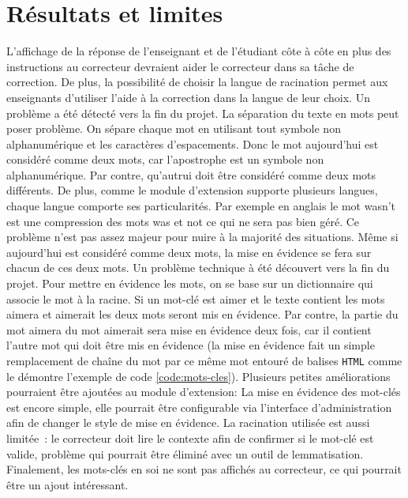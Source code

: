 ﻿\chapter{R\'esultats et limites}
L'affichage de la r\'eponse de l'enseignant et de l'\'etudiant c\^ote \`a c\^ote en plus des instructions au correcteur devraient aider le correcteur dans sa t\^ache de correction.
De plus, la possibilit\'e de choisir la langue de racination permet aux enseignants d'utiliser l'aide \`a la correction dans la langue de leur choix.
Un probl\`eme a \'et\'e d\'etect\'e vers la fin du projet.
La s\'eparation du texte en mots peut poser probl\`eme.
On s\'epare chaque mot en utilisant tout symbole non alphanum\'erique et les caract\`eres d'espacements.
Donc le mot \og aujourd'hui \fg{} est consid\'er\'e comme deux mots, car l'apostrophe est un symbole non alphanum\'erique.
Par contre, \og qu'autrui \fg{} doit \^etre consid\'er\'e comme deux mots diff\'erents.
De plus, comme le module d'extension supporte plusieurs langues, chaque langue comporte ses particularit\'es.
Par exemple en anglais le mot \og wasn't \fg{} est une compression des mots \og was \fg{} et \og not \fg{} ce qui ne sera pas bien g\'er\'e.
Ce probl\`eme n'est pas assez majeur pour nuire \`a la majorit\'e des situations.
M\^eme si \og aujourd'hui \fg{} est consid\'er\'e comme deux mots, la mise en \'evidence se fera sur chacun de ces deux mots.
Un probl\`eme technique \`a \'et\'e d\'ecouvert vers la fin du projet.
Pour mettre en \'evidence les mots, on se base sur un dictionnaire qui associe le mot \`a la racine.
Si un mot-cl\'e est \og aimer \fg{} et le texte contient les mots \og aimera \fg{} et \og aimerait \fg{} les deux mots seront mis en \'evidence.
Par contre, la partie du mot \og aimera \fg{} du mot \og aimerait \fg{} sera mise en \'evidence deux fois, car il contient l'autre mot qui doit \^etre mis en \'evidence (la mise en \'evidence fait un simple remplacement de cha\^ine du mot par ce m\^eme mot entour\'e de balises \texttt{HTML} comme le d\'emontre l'exemple de code \ref{code:mots-cles}).
Plusieurs petites am\'eliorations pourraient \^etre ajout\'ees au module d'extension:
La mise en \'evidence des mot-clés est encore simple, elle pourrait \^etre configurable via l'interface d'administration afin de changer le style de mise en \'evidence.
La racination utilis\'ee est aussi limit\'ee~: le correcteur doit lire le contexte afin de confirmer si le mot-cl\'e est valide, probl\`eme qui pourrait \^etre \'elimin\'e avec un outil de lemmatisation.
Finalement, les mots-cl\'es en soi ne sont pas affich\'es au correcteur, ce qui pourrait \^etre un ajout int\'eressant.
